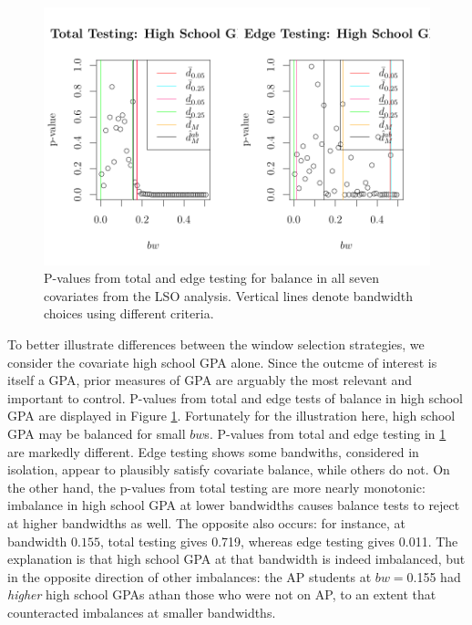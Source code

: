 \documentclass[12pt]{article}\usepackage[]{graphicx}\usepackage[]{color}
\makeatletter
\def\maxwidth{ %
  \ifdim\Gin@nat@width>\linewidth
    \linewidth
  \else
    \Gin@nat@width
  \fi
}
\newenvironment{knitrout}{}{} %
\makeatother
\begin{document}
\begin{figure}
\begin{knitrout}
\color{fgcolor}
\includegraphics[width=\maxwidth]{figure/rdd2-1} 

\end{knitrout}
\caption{P-values from total and edge testing for balance in all seven covariates
  from the LSO analysis. Vertical lines denote bandwidth choices using
  different criteria.}
\label{fig:rdpvalues2}
\end{figure}


To better illustrate differences between the window selection
strategies, we consider the covariate high school GPA alone.
Since the outcme of interest is itself a GPA, prior measures of GPA
are arguably the most relevant and important to control.
P-values from total and edge tests of balance in high school GPA are
displayed in Figure \ref{fig:rdpvalues2}.
Fortunately for the illustration here, high school GPA may be
balanced for small $bw$s.
P-values from total and edge testing in \ref{fig:rdpvalues2} are
markedly different.
Edge testing shows some bandwiths, considered in
isolation, appear to plausibly satisfy covariate balance, while others do not.
On the other hand, the p-values from total testing are more nearly
monotonic: imbalance in high school GPA at lower bandwidths causes
balance tests to reject at higher bandwidths as well.
The opposite also occurs: for instance, at bandwidth
$0.155$, total testing gives 0.719,
whereas edge testing gives 0.011.
The explanation is that high school GPA at that bandwidth is indeed
imbalanced, but in the opposite direction of other imbalances: the AP
students at $bw=$0.155 had \emph{higher} high school GPAs
athan those who were not on AP, to an extent that counteracted
imbalances at smaller bandwidths.
\end{document}
